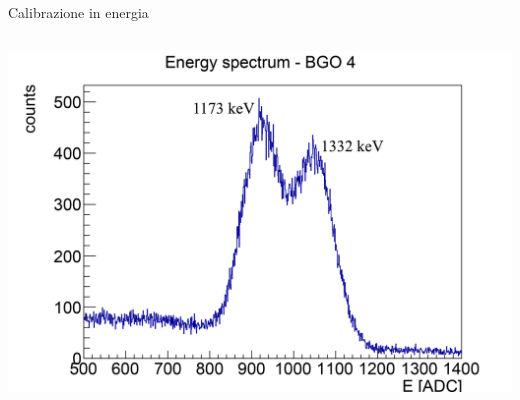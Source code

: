 \documentclass [xcolor=svgnames, 9pt] {beamer}
\begin{document}
\begin{frame}{Calibrazione in energia}
\begin{columns}
			\includegraphics[width=\linewidth]{img/ex1777.pdf}
	\end{columns}
\end{frame}





%		
%		
\end{document}
